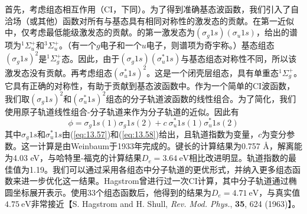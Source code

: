     首先，考虑组态相互作用（CI，下同）。为了得到准确基态波函数，我们引入了自洽场（或其他）函数对所有与基态具有相同对称性的激发态的贡献。在第一近似中，仅考虑最低能级激发态的贡献。的第一激发态为$\left(\sigma_g 1s\right)\left(\sigma_u 1s\right)$，给出的谱项为$^1\Sigma_u^+$和$^3\Sigma_u^+$。（有一个$g$电子和一个$u$电子，则谱项为奇宇称。）基态组态$\left(\sigma_g1s\right)^2$是$^1\Sigma_g^+$态。因此，由于$\left(\sigma_g1s\right)\left(\sigma_u^*1s\right)$与基态组态对称性不同，所以该激发态没有贡献。再考虑组态$\left(\sigma_u^*1s\right)^2$。这是一个闭壳层组态，具有单重态$^1\Sigma_g^+$。它具有正确的对称性，有助于贡献到基态波函数中。作为一个简单的CI波函数，我们取$\left(\sigma_g1s\right)^2$和$\left(\sigma_u^*1s\right)^2$组态的分子轨道波函数的线性组合。为了简化，我们使用原子轨道线性组合-分子轨道来作为分子轨道的近似。因此有
    \begin{equation}
        \phi = \sigma_g1s\left(1\right)\sigma_g1s\left(2\right) + c\: \sigma_u^*1s\left(1\right)\sigma_u^*1s\left(2\right)
        \label{eq:13.95}
    \end{equation}
    其中$\sigma_g1s$和$\sigma_u^*1s$由(\ref{eq:13.57})和(\ref{eq:13.58})给出，且轨道指数为变量，$c$为变分参数。这一计算是由Weinbaum于1933年完成的。键长的计算结果为0.757 \AA，解离能为4.03 eV，与哈特里-福克的计算结果$D_e = 3.64\:\mathrm{eV}$相比改进明显。轨道指数的最佳值为1.19。我们可以通过采用各组态中分子轨道的更优形式，并纳入更多组态函数来进一步优化这一结果。Hagstrom曾进行过一次CI计算，其中分子轨道通过椭圆坐标展开表示。使用33个组态函数后，他得到的结果为$D_e = 4.71\:\mathrm{eV}$，与真实值$4.75\:\mathrm{eV}$非常接近【S. Hagstrom and H. Shull, \textit{Rev. Mod. Phys.}, \textbf{35}, 624 (1963)】。

